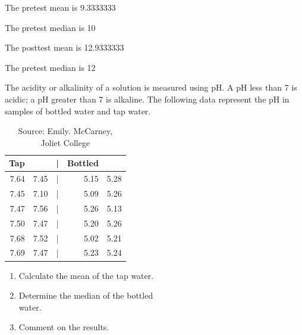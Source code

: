 \documentclass[11pt, chapterprefix=true]{scrbook}\usepackage[]{graphicx}\usepackage[]{color}
\begin{document}
\begin{exercises}
\begin{solution}
	The pretest mean is  9.3333333


	The pretest median is 10


	The posttest mean is	12.9333333


The pretest median is 12

	\end{solution}
	
	\begin{exercise}   %

	The acidity or alkalinity of a solution is measured using pH.  A pH less than 7 is acidic; a pH greater than 7 is alkaline.  The following data represent the pH in samples of bottled water and tap water.

\begin{table}[ht]
 \centering
 
	{\small{             %
	\caption{Source: Emily. McCarney, \\ Joliet College}
 \begin{tabular}{@{} rrcrr @{}}
   Tap & & | &   Bottled  & \\ \hline  
   7.64 & 7.45 & | & 5.15 & 5.28 \\
   7.45 & 7.10 & | & 5.09 & 5.26 \\
   7.47 & 7.56 & | & 5.26 & 5.13 \\
   7.50 & 7.47 & | & 5.20 & 5.26 \\
   7.68 & 7.52 & | & 5.02 & 5.21 \\
   7.69 & 7.47 & | & 5.23 & 5.24 \\
    \hline
 \end{tabular}
 }}
   \label{tab:t3_15}
 \end{table}

\begin{enumerate}
 \item Calculate the mean  of the tap water.
 \item Determine the median of the bottled \\ water.
 \item Comment on the results.
\end{enumerate} 
  \end{exercise}
%   
%   

\end{exercises}
\end{document}
